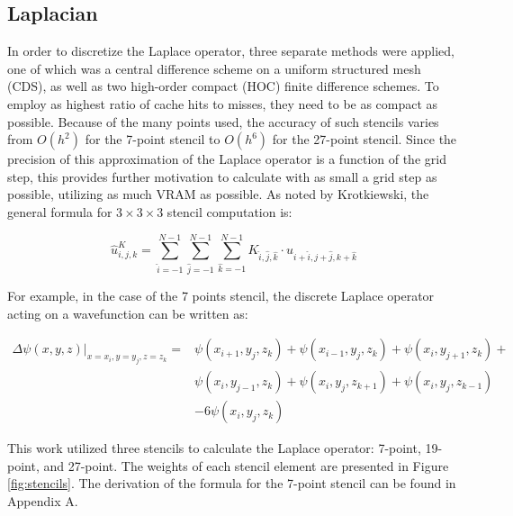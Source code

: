 \subsection{Laplacian}
In order to discretize the Laplace operator, three separate methods were applied, one of which was a central difference scheme on a uniform structured mesh (CDS), as well as two high-order compact (HOC) finite difference schemes.\cite{spotz1996hoc}
To employ as highest ratio of cache hits to misses, they need to be as compact as possible. Because of the many points used, the accuracy of such stencils varies from $O(h^2)$ for the 7-point stencil to $O(h^6)$ for the 27-point stencil. Since the precision of this approximation of the Laplace operator is a function of the grid step, this provides further motivation to calculate with as small a grid step as possible, utilizing as much VRAM as possible. As noted by Krotkiewski, the general formula for $3 \times 3 \times 3$ stencil computation is\cite{krotkiewski2011efficient}:

\begin{equation}
	\hat{u}^K_{i,j,k} = \sum_{\hat{i}=-1}^{N-1}\sum_{\hat{j}=-1}^{N-1}\sum_{\hat{k}=-1}^{N-1}K_{\hat{i},\hat{j},\hat{k}} \cdot u_{i+\hat{i},j+\hat{j},k+\hat{k}}
\end{equation}

For example, in the case of the 7 points stencil, the discrete Laplace operator acting on a wavefunction can be written as:

\begin{equation}
	\begin{aligned}
		\Delta \psi(x,y,z) \lvert_{x=x_i,y=y_j,z=z_k} =
		& \psi(x_{i+1},y_j,z_k) + \psi(x_{i-1},y_j,z_k) + \psi(x_i,y_{j+1},z_k) + \\
		& \psi(x_i,y_{j-1},z_k) + \psi(x_i,y_j,z_{k+1}) + \psi(x_i,y_j,z_{k-1}) \\
		& -6\psi(x_i,y_j,z_k)
	\end{aligned}
\end{equation}

This work utilized three stencils to calculate the Laplace operator: 7-point, 19-point, and 27-point. The weights of each stencil element are presented in Figure \ref{fig:stencils}.
The derivation of the formula for the 7-point stencil can be found in Appendix A.

